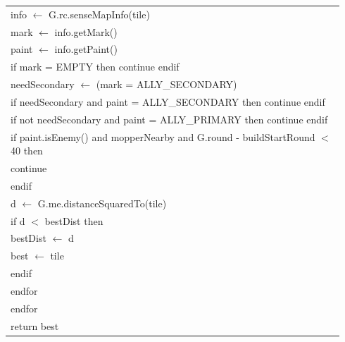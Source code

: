 \documentclass{article}
\newenvironment{pseudobox}
{
\centering
\begin{longtable}{|p{0.94\linewidth}|}
\hline
}
{
\\ \hline
\end{longtable}
\vspace{0.05cm}
}
\begin{document}
\begin{pseudobox}
\hspace*{3em} info $\leftarrow$ G.rc.senseMapInfo(tile) \\
\hspace*{3em} mark $\leftarrow$ info.getMark() \\
\hspace*{3em} paint $\leftarrow$ info.getPaint() \\

\hspace*{3em} if mark = EMPTY then continue endif \\

\hspace*{3em} needSecondary $\leftarrow$ (mark = ALLY\_SECONDARY) \\
\hspace*{3em} if needSecondary and paint = ALLY\_SECONDARY then continue endif \\
\hspace*{3em} if not needSecondary and paint = ALLY\_PRIMARY then continue endif \\

\hspace*{3em} if paint.isEnemy() and mopperNearby and G.round - buildStartRound $<$ 40 then \\
\hspace*{4em} continue \\
\hspace*{3em} endif \\

\hspace*{3em} d $\leftarrow$ G.me.distanceSquaredTo(tile) \\
\hspace*{3em} if d $<$ bestDist then \\
\hspace*{4em} bestDist $\leftarrow$ d \\
\hspace*{4em} best $\leftarrow$ tile \\
\hspace*{3em} endif \\
\hspace*{2em} endfor \\
\hspace*{1em} endfor \\

\hspace*{1em} return best
\end{pseudobox}
\end{document}
